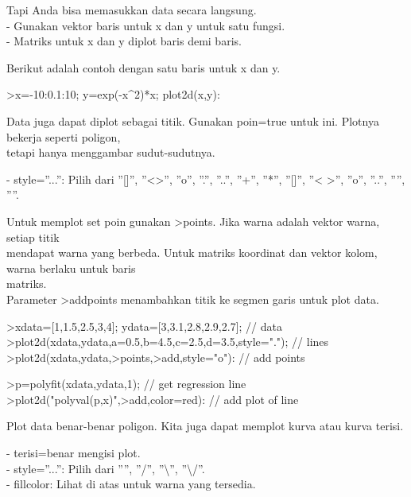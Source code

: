 \documentclass[a4paper,10pt]{article}
\begin{document}
\begin{eulernotebook}
\begin{eulercomment}
\begin{eulercomment}
\begin{eulercomment}
\begin{eulercomment}
\begin{eulercomment}
\begin{eulercomment}
\begin{eulercomment}
Tapi Anda bisa memasukkan data secara langsung.\\
- Gunakan vektor baris untuk x dan y untuk satu fungsi.\\
- Matriks untuk x dan y diplot baris demi baris.

Berikut adalah contoh dengan satu baris untuk x dan y.
\end{eulercomment}
\begin{eulerprompt}
>x=-10:0.1:10; y=exp(-x^2)*x; plot2d(x,y):
\end{eulerprompt}
\begin{eulercomment}
Data juga dapat diplot sebagai titik. Gunakan poin=true untuk ini.
Plotnya bekerja seperti poligon,\\
tetapi hanya menggambar sudut-sudutnya.

- style=”...”: Pilih dari ”[]”, ”\textless{}\textgreater{}”, ”o”, ”.”, ”..”, ”+”, ”*”, ”[]”,
”\textless{} \textgreater{}”, ”o”, ”..”, ””, ”\textbar{}”.

Untuk memplot set poin gunakan \textgreater{}points. Jika warna adalah vektor
warna, setiap titik\\
mendapat warna yang berbeda. Untuk matriks koordinat dan vektor kolom,
warna berlaku untuk baris\\
matriks.\\
Parameter \textgreater{}addpoints menambahkan titik ke segmen garis untuk plot
data.
\end{eulercomment}
\begin{eulerprompt}
>xdata=[1,1.5,2.5,3,4]; ydata=[3,3.1,2.8,2.9,2.7]; // data
>plot2d(xdata,ydata,a=0.5,b=4.5,c=2.5,d=3.5,style="."); // lines
>plot2d(xdata,ydata,>points,>add,style="o"): // add points
\end{eulerprompt}
\begin{eulerprompt}
>p=polyfit(xdata,ydata,1); // get regression line
>plot2d("polyval(p,x)",>add,color=red): // add plot of line
\end{eulerprompt}
\begin{eulercomment}
Plot data benar-benar poligon. Kita juga dapat memplot kurva atau
kurva terisi.

- terisi=benar mengisi plot.\\
- style=”...”: Pilih dari ””, ”/”, ”\textbackslash{}”, ”\textbackslash{}/”.\\
- fillcolor: Lihat di atas untuk warna yang tersedia.


\end{eulercomment}
\end{eulercomment}
\end{eulercomment}
\end{eulercomment}
\end{eulercomment}
\end{eulercomment}
\end{eulercomment}
\end{eulernotebook}
\end{document}
